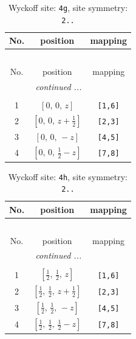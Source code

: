\documentclass[fleqn,8pt]{jsarticle}
\begin{document}
\begin{longtable}{ccc}
\caption{Wyckoff site: {\tt 4g}, site symmetry: {\tt 2..}}
 \\
 \hline \hline
No. & position & mapping \\ \hline \endfirsthead

\multicolumn{2}{l}{\tablename\ \thetable{}} \\
 \hline \hline
No. & position & mapping \\ \hline \endhead

 \hline \hline
\multicolumn{2}{r}{\footnotesize\it continued ...} \\ \endfoot

 \hline \hline
\multicolumn{2}{r}{} \\ \endlastfoot

1 & $\left[ 0,\, 0,\, z \right]$ & {\tt [1,6]} \\ \hline
2 & $\left[ 0,\, 0,\, z + \frac{1}{2} \right]$ & {\tt [2,3]} \\ \hline
3 & $\left[ 0,\, 0,\, - z \right]$ & {\tt [4,5]} \\ \hline
4 & $\left[ 0,\, 0,\, \frac{1}{2} - z \right]$ & {\tt [7,8]} \\
\end{longtable}
\renewcommand{\arraystretch}{1.2}
\begin{longtable}{ccc}
\caption{Wyckoff site: {\tt 4h}, site symmetry: {\tt 2..}}
 \\
 \hline \hline
No. & position & mapping \\ \hline \endfirsthead

\multicolumn{2}{l}{\tablename\ \thetable{}} \\
 \hline \hline
No. & position & mapping \\ \hline \endhead

 \hline \hline
\multicolumn{2}{r}{\footnotesize\it continued ...} \\ \endfoot

 \hline \hline
\multicolumn{2}{r}{} \\ \endlastfoot

1 & $\left[ \frac{1}{2},\, \frac{1}{2},\, z \right]$ & {\tt [1,6]} \\ \hline
2 & $\left[ \frac{1}{2},\, \frac{1}{2},\, z + \frac{1}{2} \right]$ & {\tt [2,3]} \\ \hline
3 & $\left[ \frac{1}{2},\, \frac{1}{2},\, - z \right]$ & {\tt [4,5]} \\ \hline
4 & $\left[ \frac{1}{2},\, \frac{1}{2},\, \frac{1}{2} - z \right]$ & {\tt [7,8]} \\
\end{longtable}
\end{document}
